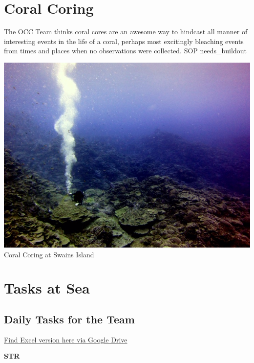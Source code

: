 \documentclass[]{book}
\begin{document}
\hypertarget{coral-coring}{%
\chapter{Coral Coring}\label{coral-coring}}

The OCC Team thinks coral cores are an awesome way to hindcast all manner of interesting events in the life of a coral, perhaps most excitingly bleaching events from times and places when no observations were collected. SOP needs\_buildout

\includegraphics{images/Merritt_Coring_by_Pomeroy.jpg}
Coral Coring at Swains Island

\hypertarget{tasks}{%
\chapter{Tasks at Sea}\label{tasks}}

\hypertarget{daily-tasks-for-the-team}{%
\section{Daily Tasks for the Team}\label{daily-tasks-for-the-team}}

\href{https://drive.google.com/open?id=1I4Hojo0qjKtUwhRqgc9aLM6_fGtjqZMM}{Find Excel version here via Google Drive}

\textbf{STR}
\end{document}
